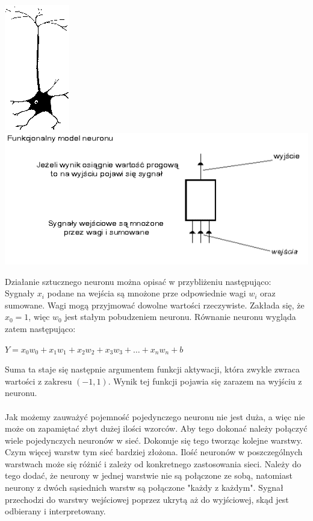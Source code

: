 \documentclass[11pt,a4paper]{article}
\begin{document}
\vspace*{1cm}
\begin{center}
\includegraphics[scale=0.7]{neuron}
\hspace*{1cm}
\includegraphics[scale=0.7]{neuron2}
\end{center}
\vspace*{1cm}

Działanie sztucznego neuronu można opisać w przybliżeniu następująco:\\
Sygnały $x_{i}$ podane na wejścia są mnożone prze odpowiednie wagi $w_{i}$ oraz sumowane. Wagi mogą 
przyjmować dowolne wartości rzeczywiste. Zakłada się, że $x_0 = 1$, więc $w_0$ jest stałym
pobudzeniem neuronu. Równanie neuronu wygląda zatem następująco:

\begin{center}
$Y = x_0w_0 + x_{1}w_{1} + x_{2}w_{2} + x_{3}w_{3} + … + x_{n}w_{n} + b$\\
\end{center}

Suma ta staje się następnie argumentem funkcji aktywacji, która zwykle zwraca wartości z zakresu 
$(-1,1)$. Wynik tej funkcji pojawia się zarazem na wyjściu z neuronu.\\
\\
Jak możemy zauważyć pojemność pojedynczego neuronu nie jest duża, a więc nie może on zapamiętać 
zbyt dużej ilości wzorców. Aby tego dokonać należy połączyć wiele pojedynczych neuronów w sieć. 
Dokonuje się tego tworząc kolejne warstwy. Czym więcej warstw tym sieć bardziej złożona. Ilość 
neuronów w poszczególnych warstwach może się różnić i zależy od konkretnego zastosowania sieci. 
Należy do tego dodać, że neurony w jednej warstwie nie są połączone ze sobą, natomiast neurony z
dwóch sąsiednich warstw są połączone "każdy z każdym". Sygnał przechodzi do warstwy wejściowej 
poprzez ukrytą aż do wyjściowej, skąd jest odbierany i interpretowany.
\end{document}

